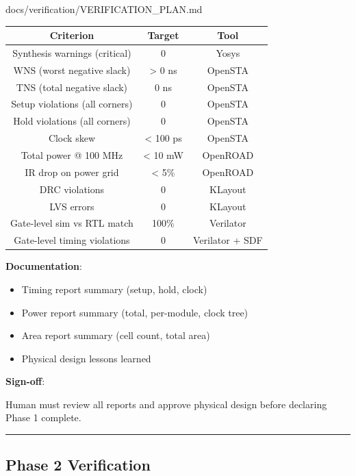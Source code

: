 \begin{relocated}{docs/verification/VERIFICATION_PLAN.md}
{
\begin{longtable}[]{@{}ccc@{}}
\toprule\noalign{}
Criterion & Target & Tool \\
\midrule\noalign{}
\endhead
\bottomrule\noalign{}
\endlastfoot
Synthesis warnings (critical) & 0 & Yosys \\
WNS (worst negative slack) & \textgreater{} 0 ns & OpenSTA \\
TNS (total negative slack) & 0 ns & OpenSTA \\
Setup violations (all corners) & 0 & OpenSTA \\
Hold violations (all corners) & 0 & OpenSTA \\
Clock skew & \textless{} 100 ps & OpenSTA \\
Total power @ 100 MHz & \textless{} 10 mW & OpenROAD \\
IR drop on power grid & \textless{} 5\% & OpenROAD \\
DRC violations & 0 & KLayout \\
LVS errors & 0 & KLayout \\
Gate-level sim vs RTL match & 100\% & Verilator \\
Gate-level timing violations & 0 & Verilator + SDF \\
\end{longtable}
}

\textbf{Documentation}:

\begin{itemize}
\tightlist
\item
  Timing report summary (setup, hold, clock)
\item
  Power report summary (total, per-module, clock tree)
\item
  Area report summary (cell count, total area)
\item
  Physical design lessons learned
\end{itemize}

\textbf{Sign-off}:

Human must review all reports and approve physical design before
declaring Phase 1 complete.

\begin{center}\rule{0.5\linewidth}{0.5pt}\end{center}

\subsection{Phase 2 Verification}\label{ds:ch:verification-plan:phase-2-verification}


\end{relocated}
